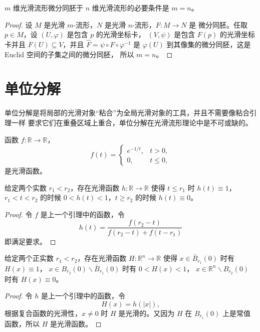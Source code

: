 \documentclass[fontset=none]{Notes}
\newcommand{\abs}[1]{\left|#1\right|}
\begin{document}
\begin{theorem}[维数的微分同胚不变性]
  $m$ 维光滑流形微分同胚于 $n$ 维光滑流形的必要条件是 $m=n$。
\end{theorem}
\begin{proof}
  设 $M$ 是光滑 $m$-流形，$N$ 是光滑 $n$-流形，$F:M\to N$ 是
  微分同胚。任取 $p\in M$，设 $(U,\varphi)$ 是包含 $p$ 的光滑坐标卡，
  $(V,\psi)$ 是包含 $F(p)$ 的光滑坐标卡并且 $F(U)\subseteq V$，并且 $\hat F=\psi\circ F\circ\varphi^{-1}$
  是 $\varphi(U)$ 到其像集的微分同胚，这是 Euclid 空间的子集之间的微分同胚，
  所以 $m=n$。
\end{proof}


\section{单位分解}

单位分解是将局部的光滑对象“粘合”为全局光滑对象的工具，并且不需要像粘合引理一样
要求它们在重叠区域上重合，单位分解在光滑流形理论中是不可或缺的。

\begin{lemma}
  函数 $f:\mathbb{R}\to\mathbb{R}$，
  \[
    f(t)=\begin{cases}
      e^{-1/t}, &t>0,\\
      0,& t\leq 0,
    \end{cases}  
  \]
  是光滑函数。
\end{lemma}

\begin{lemma}
  给定两个实数 $r_1 <r_2$，存在光滑函数 $h:\mathbb{R}\to\mathbb{R}$
  使得 $t\leq r_1$ 时 $h(t)\equiv 1$，$r_1<t<r_2$ 的时候 
  $0<h(t)<1$，$t\geq r_2$ 的时候 $h(t)\equiv 0$。
\end{lemma}
\begin{proof}
  令 $f$ 是上一个引理中的函数，令
  \[
    h(t)=\frac{f(r_2-t)}{f(r_2-t)+f(t-r_1)}
  \]
  即满足要求。 
\end{proof}

\begin{lemma}
  给定两个正实数 $r_1 <r_2$，存在光滑函数 $H:\mathbb{R}^n\to\mathbb{R}$
  使得 $x\in \bar{B}_{r_1}(0)$ 时有 $H(x)\equiv 1$，
  $x\in B_{r_2}(0)\smallsetminus \bar{B}_{r_1}(0)$ 时有 $0<H(x)<1$，
  $x\in\mathbb{R}^n\smallsetminus B_{r_2}(0)$ 时有 $H(x)\equiv 0$。
\end{lemma}
\begin{proof}
  令 $h$ 是上一个引理中的函数，令
  \[
    H(x)=h(\abs{x}),
  \]
  根据复合函数的光滑性，$x\neq 0$ 时 $H$ 是光滑的。又因为
  $H$ 在 $B_{r_1}(0)$ 上是常值函数，所以 $H$ 是光滑函数。
\end{proof}
\end{document}
